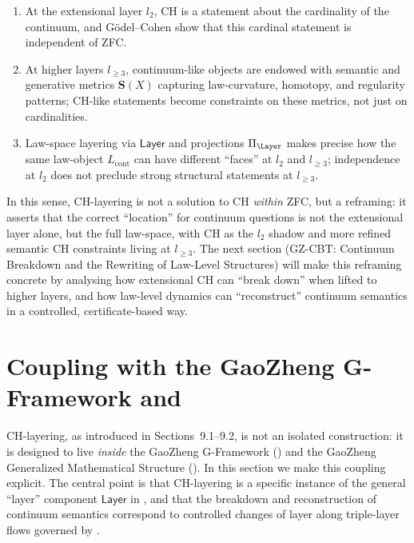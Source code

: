 \documentclass[11pt]{book}
\theoremstyle{plain}
\theoremstyle{definition}
\newcommand{\GFramework}{\text{G-Framework}} \newcommand{\GAlgebra}{\text{G-Algebra}}
\begin{document}
\begin{enumerate}[label=\arabic*)]
  \item At the extensional layer $l_2$, CH is a statement about the
        cardinality of the continuum, and Gödel--Cohen show that this
        cardinal statement is independent of ZFC.
  \item At higher layers $l_{\ge3}$, continuum-like objects are
        endowed with semantic and generative metrics
        $\mathbf{S}(X)$ capturing law-curvature, homotopy, and
        regularity patterns; CH-like statements become constraints on
        these metrics, not just on cardinalities.
  \item Law-space layering via $\mathsf{Layer}$ and projections
        $\Pi_\Layer$ makes precise how the same law-object
        $L_{\mathrm{cont}}$ can have different “faces” at $l_2$ and
        $l_{\ge3}$; independence at $l_2$ does not preclude strong
        structural statements at $l_{\ge3}$.
\end{enumerate}

In this sense, CH-layering is not a solution to CH \emph{within} ZFC,
but a reframing: it asserts that the correct “location” for continuum
questions is not the extensional layer alone, but the full law-space,
with CH as the $l_2$ shadow and more refined semantic CH constraints
living at $l_{\ge3}$. The next section (GZ-CBT: Continuum Breakdown and
the Rewriting of Law-Level Structures) will make this reframing
concrete by analysing how extensional CH can “break down” when lifted
to higher layers, and how law-level dynamics can “reconstruct”
continuum semantics in a controlled, certificate-based way.



\section{Coupling with the GaoZheng G-Framework and \GZGMS}


CH-layering, as introduced in Sections~9.1--9.2, is not an isolated
construction: it is designed to live \emph{inside} the GaoZheng
G-Framework (\GFramework) and the GaoZheng Generalized Mathematical
Structure (\GZGMS). In this section we make this coupling explicit. The
central point is that CH-layering is a specific instance of the general
“layer” component $\mathsf{Layer}$ in \GZGMS, and that the breakdown
and reconstruction of continuum semantics correspond to controlled
changes of layer along triple-layer flows governed by \GZTLC.
\end{document}
